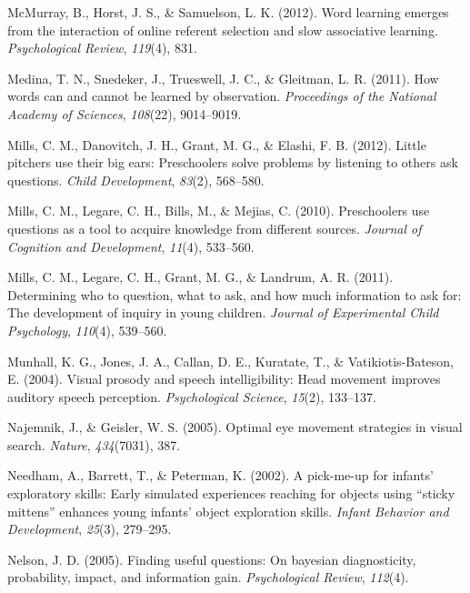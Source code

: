 \documentclass[oneside]{report}
\begin{document}
\hypertarget{ref-mcmurray2012word}{}
McMurray, B., Horst, J. S., \& Samuelson, L. K. (2012). Word learning
emerges from the interaction of online referent selection and slow
associative learning. \emph{Psychological Review}, \emph{119}(4), 831.

\hypertarget{ref-medina2011words}{}
Medina, T. N., Snedeker, J., Trueswell, J. C., \& Gleitman, L. R.
(2011). How words can and cannot be learned by observation.
\emph{Proceedings of the National Academy of Sciences}, \emph{108}(22),
9014--9019.

\hypertarget{ref-mills2012little}{}
Mills, C. M., Danovitch, J. H., Grant, M. G., \& Elashi, F. B. (2012).
Little pitchers use their big ears: Preschoolers solve problems by
listening to others ask questions. \emph{Child Development},
\emph{83}(2), 568--580.

\hypertarget{ref-mills2010preschoolers}{}
Mills, C. M., Legare, C. H., Bills, M., \& Mejias, C. (2010).
Preschoolers use questions as a tool to acquire knowledge from different
sources. \emph{Journal of Cognition and Development}, \emph{11}(4),
533--560.

\hypertarget{ref-mills2011determining}{}
Mills, C. M., Legare, C. H., Grant, M. G., \& Landrum, A. R. (2011).
Determining who to question, what to ask, and how much information to
ask for: The development of inquiry in young children. \emph{Journal of
Experimental Child Psychology}, \emph{110}(4), 539--560.

\hypertarget{ref-munhall2004visual}{}
Munhall, K. G., Jones, J. A., Callan, D. E., Kuratate, T., \&
Vatikiotis-Bateson, E. (2004). Visual prosody and speech
intelligibility: Head movement improves auditory speech perception.
\emph{Psychological Science}, \emph{15}(2), 133--137.

\hypertarget{ref-najemnik2005optimal}{}
Najemnik, J., \& Geisler, W. S. (2005). Optimal eye movement strategies
in visual search. \emph{Nature}, \emph{434}(7031), 387.

\hypertarget{ref-needham2002pick}{}
Needham, A., Barrett, T., \& Peterman, K. (2002). A pick-me-up for
infants' exploratory skills: Early simulated experiences reaching for
objects using ``sticky mittens'' enhances young infants' object
exploration skills. \emph{Infant Behavior and Development},
\emph{25}(3), 279--295.

\hypertarget{ref-nelson2005finding}{}
Nelson, J. D. (2005). Finding useful questions: On bayesian
diagnosticity, probability, impact, and information gain.
\emph{Psychological Review}, \emph{112}(4).
\end{document}
